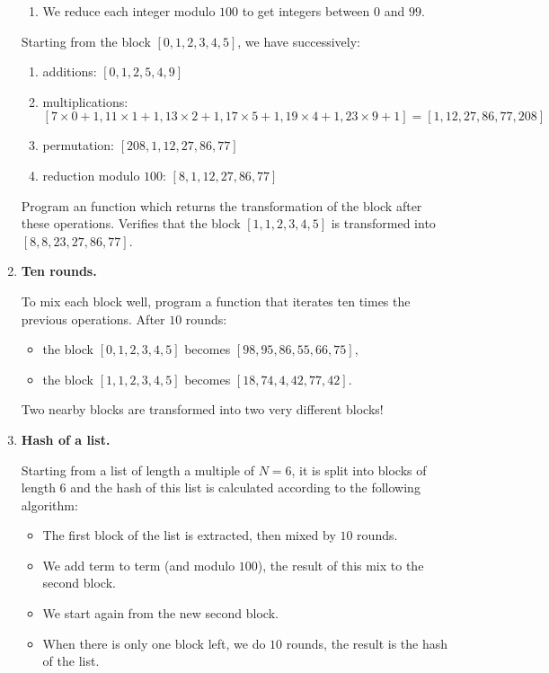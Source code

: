\documentclass[11pt,class=report,crop=false]{standalone}
\begin{document}
\begin{activite}
\begin{enumerate}
\begin{enumerate}
    \item We reduce each integer modulo $100$ to get integers between $0$ and $99$.
  \end{enumerate}



  
  Starting from the block $[0, 1, 2, 3, 4, 5]$, we have successively:
   \begin{enumerate}
    \item additions: $[0, 1, 2, 5, 4, 9]$
    
    \item multiplications: $[7\times 0 + 1, 11\times 1+1, 13\times 2+1, 17 \times 5+1,19 \times  4+1, 23 \times 9+1] = [1,12,27,86,77,208]$ 
    
    \item permutation: $[208,1,12,27,86,77]$
    
    \item reduction modulo $100$: $[8,1,12,27,86,77]$
  \end{enumerate}
  
  Program an  function which returns the transformation of the block after these operations. Verifies that the block $[1, 1, 2, 3, 4, 5]$ is transformed into $[8, 8, 23, 27, 86, 77]$.
 
    \item \textbf{Ten rounds.} 
    
    To mix each block well, program a  function that iterates ten times the previous operations.
    After $10$ rounds:
    \begin{itemize}
      \item the block $[0, 1, 2, 3, 4, 5]$ becomes $[98, 95, 86, 55, 66, 75]$,
      \item the block $[1, 1, 2, 3, 4, 5]$ becomes $[18, 74, 4, 42, 77, 42]$.
    \end{itemize}
 Two nearby blocks are transformed into two very different blocks! 
   
   \item \textbf{Hash of a list.} 
   
   Starting from a list of length a multiple of $N=6$, it is split into blocks of length $6$ and the hash of this list is calculated according to the following algorithm:
   \begin{itemize}
     \item The first block of the list is extracted, then mixed by $10$ rounds.
     \item We add term to term (and modulo $100$), the result of this mix to the second block.
     \item We start again from the new second block.
     \item When there is only one block left, we do $10$ rounds, the result is the hash of the list.
   \end{itemize}
 

\end{enumerate}
\end{activite}
\end{document}
